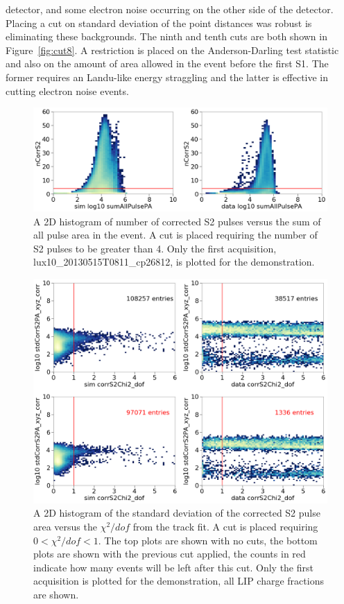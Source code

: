 detector, and some electron noise occurring on the other side of the detector. Placing a cut on standard deviation of the point distances was robust is eliminating these backgrounds. The ninth and tenth cuts are both shown in Figure~\ref{fig:cut8}. A restriction is placed on the Anderson-Darling test statistic and also on the amount of area allowed in the event before the first S1. The former requires an Landu-like energy straggling and the latter is effective in cutting electron noise events. 


\begin{figure}[htbp]
\begin{center}
\includegraphics[width=\textwidth]{figures/lips/cut0.png}
\caption{ A 2D histogram of number of corrected S2 pulses versus the sum of all pulse area in the event. A cut is placed requiring the number of S2 pulses to be greater than 4. Only the first acquisition, lux10\_20130515T0811\_cp26812, is plotted for the demonstration.}
\label{fig:cut0}
\end{center}
\end{figure}

\begin{figure}[htbp]
\begin{center}
\includegraphics[width=\textwidth]{figures/lips/cut1.png}
\caption{A 2D histogram of the standard deviation of the corrected S2 pulse area versus the $\chi^{2}/dof$ from the track fit. A cut is placed requiring  $0 < \chi^{2}/dof < 1$. The top plots are shown with no cuts, the bottom plots are shown with the previous cut applied, the counts in red indicate how many events will be left after this cut. Only the first acquisition is plotted for the demonstration, all \acs{LIP} charge fractions are shown. }
\label{fig:cut1}
\end{center}
\end{figure}

